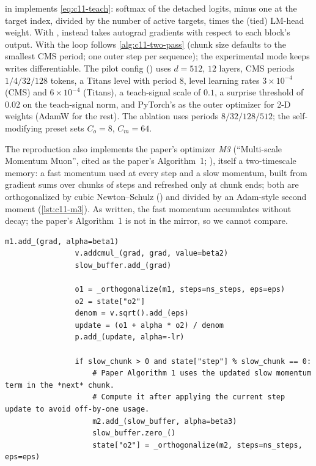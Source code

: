 \begin{implnote}[title={In the code: training loop, teach signal and configs}]
 in  implements \cref{eq:c11-teach}: softmax of the
detached logits, minus one at the target index, divided by the number of active targets, times
the (tied) LM-head weight. With ,
 instead takes autograd gradients with respect to each block's
output. With  the loop follows \cref{alg:c11-two-pass} (chunk
size defaults to the smallest CMS period; one outer step per sequence); the experimental
 mode keeps writes differentiable. The pilot config () uses $d = 512$, $12$ layers, CMS periods
$1/4/32/128$ tokens, a Titans level with period $8$, level learning rates $3\times10^{-4}$ (CMS)
and $6\times10^{-4}$ (Titans), a teach-signal scale of $0.1$, a surprise threshold of $0.02$ on the
teach-signal norm, and PyTorch's  as the outer optimizer for 2-D weights
(AdamW for the rest). The ablation  uses periods
$8/32/128/512$; the self-modifying preset sets $C_o = 8$, $C_m = 64$.
\end{implnote}

The reproduction also implements the paper's optimizer \emph{M3} (``Multi-scale Momentum Muon'',
cited as the paper's Algorithm~1; ), itself a two-timescale memory: a fast
momentum used at every step and a slow momentum, built from gradient sums over chunks of
 steps and refreshed only at chunk ends; both are orthogonalized by cubic
Newton--Schulz () and divided by an Adam-style second moment (\cref{lst:c11-m3}).
As written, the fast momentum accumulates  without decay; the paper's
Algorithm~1 is not in the mirror, so we cannot compare.

\begin{lstlisting}[caption={Excerpt from \texttt{repos/\allowbreak kmccleary3301\_\_nested\_learning/\allowbreak src/\allowbreak nested\_learning/\allowbreak optim/\allowbreak m3.py} (\texttt{M3.step}): fast and slow momenta},label={lst:c11-m3}]
                m1.add_(grad, alpha=beta1)
                v.addcmul_(grad, grad, value=beta2)
                slow_buffer.add_(grad)

                o1 = _orthogonalize(m1, steps=ns_steps, eps=eps)
                o2 = state["o2"]
                denom = v.sqrt().add_(eps)
                update = (o1 + alpha * o2) / denom
                p.add_(update, alpha=-lr)

                if slow_chunk > 0 and state["step"] % slow_chunk == 0:
                    # Paper Algorithm 1 uses the updated slow momentum term in the *next* chunk.
                    # Compute it after applying the current step update to avoid off-by-one usage.
                    m2.add_(slow_buffer, alpha=beta3)
                    slow_buffer.zero_()
                    state["o2"] = _orthogonalize(m2, steps=ns_steps, eps=eps)
\end{lstlisting}

